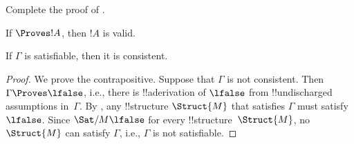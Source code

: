 \documentclass[../../../include/open-logic-section]{subfiles}
\begin{document}
\begin{prob}
Complete the proof of .
\end{prob}

\begin{cor}
If $\Proves !A$, then $!A$ is valid.
\end{cor}

\begin{cor}
If $\Gamma$ is satisfiable, then it is consistent.
\end{cor}

\begin{proof}
We prove the contrapositive.  Suppose that $\Gamma$ is not consistent.
Then $\Gamma \Proves \lfalse$, i.e., there is !!a{derivation} of
$\lfalse$ from !!{undischarged} assumptions in~$\Gamma$. By
, any !!{structure} $\Struct{M}$ that satisfies
$\Gamma$ must satisfy $\lfalse$.  Since $\Sat/{M}{\lfalse}$ for every
!!{structure}~$\Struct{M}$, no $\Struct{M}$ can satisfy $\Gamma$,
i.e., $\Gamma$ is not satisfiable.
\end{proof}
\end{document}
